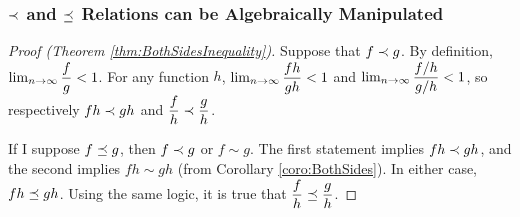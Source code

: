 \subsubsection{$\prec$ and $\preceq$ Relations can be Algebraically Manipulated}

\begin{proof}[Proof (Theorem \ref{thm:BothSidesInequality})]
	Suppose that $f \prec g$. By definition, $\lim_{n \to \infty} \dfrac{f}{g} < 1$. For any function $h$, $\lim_{n \to \infty} \dfrac{fh}{gh} < 1$ and $\lim_{n \to \infty} \dfrac{f / h}{g / h} < 1$, so respectively $fh \prec gh$ and $\dfrac{f}{h} \prec \dfrac{g}{h}$.
	
	If I suppose $f \preceq g$, then $f \prec g$ or $f \sim g$. The first statement implies $fh \prec gh$, and the second implies $fh \sim gh$ (from Corollary \ref{coro:BothSides}). In either case, $fh \preceq gh$. Using the same logic, it is true that $\dfrac{f}{h} \preceq \dfrac{g}{h}$.
\end{proof}